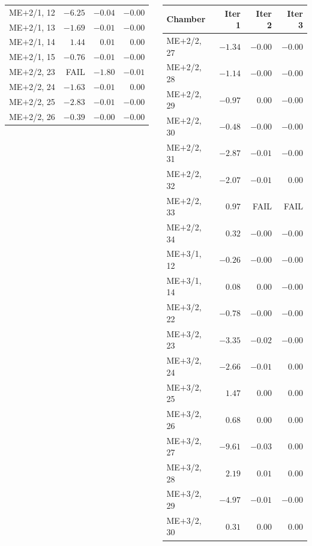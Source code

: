 \documentclass[compress]{beamer}
\begin{document}
\begin{frame}
\begin{columns}
\begin{tabular}{l r r r}
ME$+$2/1, 12 &  $-6.25$ &  $-0.04$ &  $-0.00$ \\
ME$+$2/1, 13 &  $-1.69$ &  $-0.01$ &  $-0.00$ \\
ME$+$2/1, 14 &  $ 1.44$ &  $ 0.01$ &  $ 0.00$ \\
ME$+$2/1, 15 &  $-0.76$ &  $-0.01$ &  $-0.00$ \\
ME$+$2/2, 23 &  FAIL &  $-1.80$ &  $-0.01$ \\
ME$+$2/2, 24 &  $-1.63$ &  $-0.01$ &  $ 0.00$ \\
ME$+$2/2, 25 &  $-2.83$ &  $-0.01$ &  $-0.00$ \\
ME$+$2/2, 26 &  $-0.39$ &  $-0.00$ &  $-0.00$ \\
\end{tabular}

\begin{tabular}{l r r r}
Chamber & Iter 1 & Iter 2 & Iter 3 \\\hline
ME$+$2/2, 27 &  $-1.34$ &  $-0.00$ &  $-0.00$ \\
ME$+$2/2, 28 &  $-1.14$ &  $-0.00$ &  $-0.00$ \\
ME$+$2/2, 29 &  $-0.97$ &  $ 0.00$ &  $-0.00$ \\
ME$+$2/2, 30 &  $-0.48$ &  $-0.00$ &  $-0.00$ \\
ME$+$2/2, 31 &  $-2.87$ &  $-0.01$ &  $-0.00$ \\
ME$+$2/2, 32 &  $-2.07$ &  $-0.01$ &  $ 0.00$ \\
ME$+$2/2, 33 &  $ 0.97$ &  FAIL &  FAIL \\
ME$+$2/2, 34 &  $ 0.32$ &  $-0.00$ &  $-0.00$ \\
ME$+$3/1, 12 &  $-0.26$ &  $-0.00$ &  $-0.00$ \\
ME$+$3/1, 14 &  $ 0.08$ &  $ 0.00$ &  $-0.00$ \\
ME$+$3/2, 22 &  $-0.78$ &  $-0.00$ &  $-0.00$ \\
ME$+$3/2, 23 &  $-3.35$ &  $-0.02$ &  $-0.00$ \\
ME$+$3/2, 24 &  $-2.66$ &  $-0.01$ &  $ 0.00$ \\
ME$+$3/2, 25 &  $ 1.47$ &  $ 0.00$ &  $ 0.00$ \\
ME$+$3/2, 26 &  $ 0.68$ &  $ 0.00$ &  $ 0.00$ \\
ME$+$3/2, 27 &  $-9.61$ &  $-0.03$ &  $ 0.00$ \\
ME$+$3/2, 28 &  $ 2.19$ &  $ 0.01$ &  $ 0.00$ \\
ME$+$3/2, 29 &  $-4.97$ &  $-0.01$ &  $-0.00$ \\
ME$+$3/2, 30 &  $ 0.31$ &  $ 0.00$ &  $ 0.00$ \\

\end{tabular}
\end{columns}
\end{frame}
\end{document}
